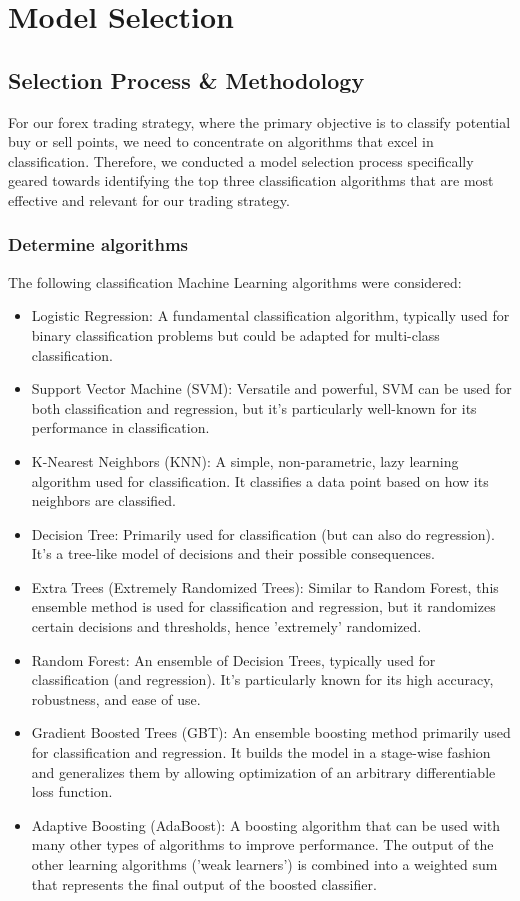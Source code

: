 \documentclass{article}
\begin{document}
\newpage
\section{Model Selection}

\subsection{Selection Process \& Methodology}
For our forex trading strategy, where the primary objective is to classify potential buy or sell points, we need to concentrate on algorithms that excel in classification. Therefore, we conducted a model selection process specifically geared towards identifying the top three classification algorithms that are most effective and relevant for our trading strategy.
\subsubsection{Determine algorithms}

The following classification Machine Learning algorithms were considered:
\begin{itemize}
\item Logistic Regression: A fundamental classification algorithm, typically used for binary classification problems but could be adapted for multi-class classification.
\item Support Vector Machine (SVM): Versatile and powerful, SVM can be used for both classification and regression, but it's particularly well-known for its performance in classification.
\item K-Nearest Neighbors (KNN): A simple, non-parametric, lazy learning algorithm used for classification. It classifies a data point based on how its neighbors are classified.
\item Decision Tree: Primarily used for classification (but can also do regression). It's a tree-like model of decisions and their possible consequences.
\item Extra Trees (Extremely Randomized Trees): Similar to Random Forest, this ensemble method is used for classification and regression, but it randomizes certain decisions and thresholds, hence 'extremely' randomized.
\item Random Forest: An ensemble of Decision Trees, typically used for classification (and regression). It's particularly known for its high accuracy, robustness, and ease of use.
\item Gradient Boosted Trees (GBT): An ensemble boosting method primarily used for classification and regression. It builds the model in a stage-wise fashion and generalizes them by allowing optimization of an arbitrary differentiable loss function.
\item Adaptive Boosting (AdaBoost): A boosting algorithm that can be used with many other types of algorithms to improve performance. The output of the other learning algorithms ('weak learners') is combined into a weighted sum that represents the final output of the boosted classifier.
\end{itemize}
\end{document}
